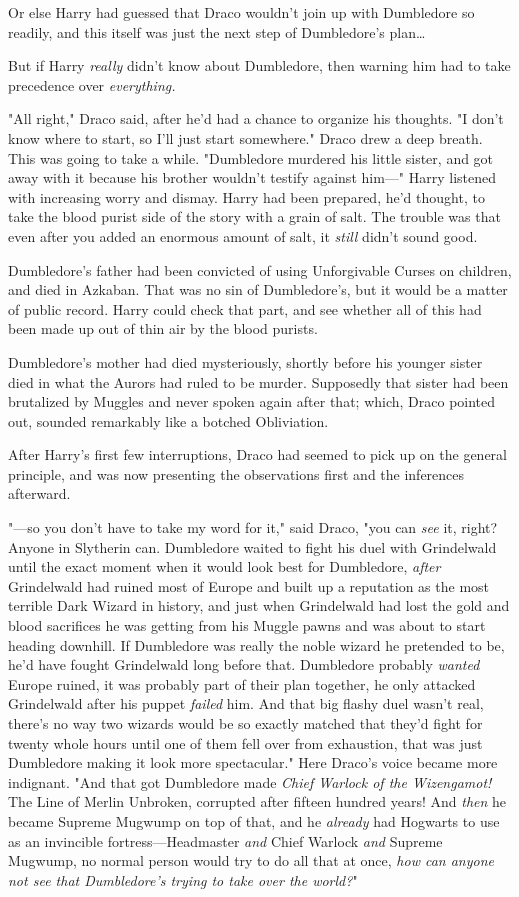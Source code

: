 Or else Harry had guessed that Draco wouldn’t join up with Dumbledore so
readily, and this itself was just the next step of Dumbledore’s plan…

But if Harry \emph{really} didn’t know about Dumbledore, then warning him had
to take precedence over \emph{everything.}

"All right," Draco said, after he’d had a chance to organize his thoughts. "I
don’t know where to start, so I’ll just start somewhere." Draco drew a deep
breath. This was going to take a while. "Dumbledore murdered his little sister,
and got away with it because his brother wouldn’t testify against him—"
\later
Harry listened with increasing worry and dismay. Harry had been prepared, he’d
thought, to take the blood purist side of the story with a grain of salt. The
trouble was that even after you added an enormous amount of salt, it
\emph{still} didn’t sound good.

Dumbledore’s father had been convicted of using Unforgivable Curses on
children, and died in Azkaban. That was no sin of Dumbledore’s, but it would be
a matter of public record. Harry could check that part, and see whether all of
this had been made up out of thin air by the blood purists.

Dumbledore’s mother had died mysteriously, shortly before his younger sister
died in what the Aurors had ruled to be murder. Supposedly that sister had been
brutalized by Muggles and never spoken again after that; which, Draco pointed
out, sounded remarkably like a botched Obliviation.

After Harry’s first few interruptions, Draco had seemed to pick up on the
general principle, and was now presenting the observations first and the
inferences afterward.

"—so you don’t have to take my word for it," said Draco, "you can \emph{see}
it, right? Anyone in Slytherin can. Dumbledore waited to fight his duel with
Grindelwald until the exact moment when it would look best for Dumbledore,
\emph{after} Grindelwald had ruined most of Europe and built up a reputation as
the most terrible Dark Wizard in history, and just when Grindelwald had lost
the gold and blood sacrifices he was getting from his Muggle pawns and was
about to start heading downhill. If Dumbledore was really the noble wizard he
pretended to be, he’d have fought Grindelwald long before that. Dumbledore
probably \emph{wanted} Europe ruined, it was probably part of their plan
together, he only attacked Grindelwald after his puppet \emph{failed} him. And
that big flashy duel wasn’t real, there’s no way two wizards would be so
exactly matched that they’d fight for twenty whole hours until one of them fell
over from exhaustion, that was just Dumbledore making it look more
spectacular." Here Draco’s voice became more indignant. "And that got
Dumbledore made \emph{Chief Warlock of the Wizengamot!} The Line of Merlin
Unbroken, corrupted after fifteen hundred years! And \emph{then} he became
Supreme Mugwump on top of that, and he \emph{already} had Hogwarts to use as an
invincible fortress—Headmaster \emph{and} Chief Warlock \emph{and} Supreme
Mugwump, no normal person would try to do all that at once, \emph{how can
anyone not see that Dumbledore’s trying to take over the world?}"

